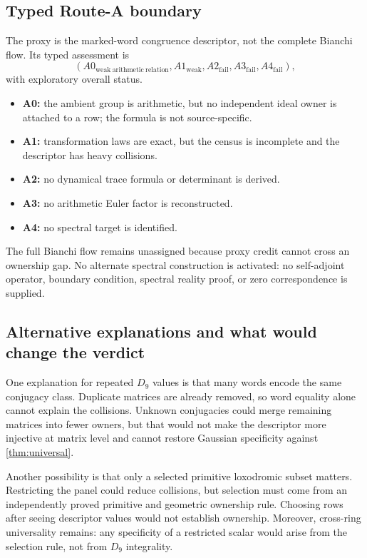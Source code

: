 \documentclass[11pt,a4paper]{article}
\theoremstyle{definition}
\theoremstyle{remark}
\begin{document}
\subsection{Typed Route-A boundary}

The proxy is the marked-word congruence descriptor, not the complete Bianchi flow. Its typed assessment is
\[
 (A0_{\mathrm{weak\ arithmetic\ relation}},
 A1_{\mathrm{weak}},A2_{\mathrm{fail}},A3_{\mathrm{fail}},A4_{\mathrm{fail}}),
\]
with exploratory overall status.
\begin{itemize}
 \item \textbf{A0:} the ambient group is arithmetic, but no independent ideal owner is attached to a row; the formula is not source-specific.
 \item \textbf{A1:} transformation laws are exact, but the census is incomplete and the descriptor has heavy collisions.
 \item \textbf{A2:} no dynamical trace formula or determinant is derived.
 \item \textbf{A3:} no arithmetic Euler factor is reconstructed.
 \item \textbf{A4:} no spectral target is identified.
\end{itemize}

The full Bianchi flow remains unassigned because proxy credit cannot cross an ownership gap. No alternate spectral construction is activated: no self-adjoint operator, boundary condition, spectral reality proof, or zero correspondence is supplied.

\subsection{Alternative explanations and what would change the verdict}

One explanation for repeated \(D_9\) values is that many words encode the same conjugacy class. Duplicate matrices are already removed, so word equality alone cannot explain the collisions. Unknown conjugacies could merge remaining matrices into fewer owners, but that would not make the descriptor more injective at matrix level and cannot restore Gaussian specificity against \cref{thm:universal}.

Another possibility is that only a selected primitive loxodromic subset matters. Restricting the panel could reduce collisions, but selection must come from an independently proved primitive and geometric ownership rule. Choosing rows after seeing descriptor values would not establish ownership. Moreover, cross-ring universality remains: any specificity of a restricted scalar would arise from the selection rule, not from \(D_9\) integrality.
\end{document}
